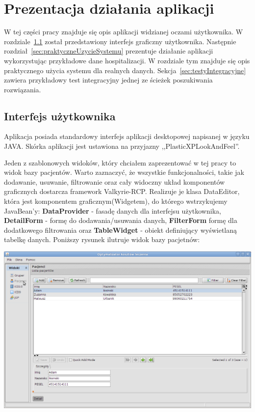 \chapter{Prezentacja działania aplikacji}
\label{cha:prezentacja}

W tej części pracy znajduje się opis aplikacji widzianej oczami użytkownika. W rozdziale~\ref{sec:interfejsUzytkownika} został
przedstawiony interfejs graficzny użytkownika. Następnie rozdział~\ref{sec:praktyczneUzycieSystemu} prezentuje działanie aplikacji wykorzystując przykładowe dane hospitalizacji. W rozdziale tym znajduje się opis praktycznego użycia systemu dla realnych danych. Sekcja~\ref{sec:testyIntegracyjne} zawiera przykładowy test integracyjny jednej ze ścieżek poszukiwania rozwiązania.


\section{Interfejs użytkownika}
\label{sec:interfejsUzytkownika}
Aplikacja posiada standardowy interfejs aplikacji desktopowej napisanej w języku JAVA. Skórka aplikacji jest ustawiona na przyjazny ,,PlasticXPLookAndFeel''.

Jeden z szablonowych widoków, który chciałem zaprezentować w tej pracy to widok bazy pacjentów. Warto zaznaczyć, że wszystkie funkcjonalności, takie jak dodawanie, usuwanie, filtrowanie oraz cały widoczny układ komponentów graficznych dostarcza framework Valkyrie-RCP. Realizuje je klasa DataEditor, która jest komponentem graficznym(Widgetem), do którego wstrzykujemy JavaBean'y: \textbf{DataProvider} - fasadę danych dla interfejsu użytkownika, \textbf{DetailForm} - formę do dodawania/usuwania danych, \textbf{FilterForm} formę dla dodatkowego filtrowania oraz \textbf{TableWidget} - obiekt definiujący wyświetlaną tabelkę danych. Poniższy rysunek ilutruje widok bazy pacjetnów:

\includegraphics[scale=0.4]{images/patient} 

